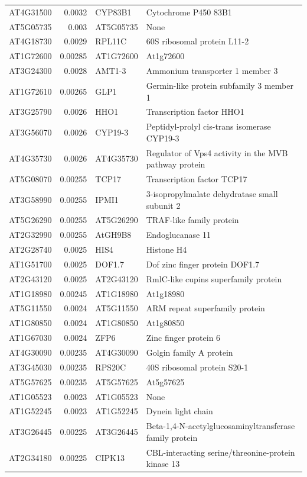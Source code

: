 \documentclass[11pt]{article}
\begin{document}
\begin{center}
\begin{tabular}{lrll}
AT4G31500 & 0.0032 & CYP83B1 & Cytochrome P450 83B1\\
AT5G05735 & 0.003 & AT5G05735 & None\\
AT4G18730 & 0.0029 & RPL11C & 60S ribosomal protein L11-2\\
AT1G72600 & 0.00285 & AT1G72600 & At1g72600\\
AT3G24300 & 0.0028 & AMT1-3 & Ammonium transporter 1 member 3\\
AT1G72610 & 0.00265 & GLP1 & Germin-like protein subfamily 3 member 1\\
AT3G25790 & 0.0026 & HHO1 & Transcription factor HHO1\\
AT3G56070 & 0.0026 & CYP19-3 & Peptidyl-prolyl cis-trans isomerase CYP19-3\\
AT4G35730 & 0.0026 & AT4G35730 & Regulator of Vps4 activity in the MVB pathway protein\\
AT5G08070 & 0.00255 & TCP17 & Transcription factor TCP17\\
AT3G58990 & 0.00255 & IPMI1 & 3-isopropylmalate dehydratase small subunit 2\\
AT5G26290 & 0.00255 & AT5G26290 & TRAF-like family protein\\
AT2G32990 & 0.00255 & AtGH9B8 & Endoglucanase 11\\
AT2G28740 & 0.0025 & HIS4 & Histone H4\\
AT1G51700 & 0.0025 & DOF1.7 & Dof zinc finger protein DOF1.7\\
AT2G43120 & 0.0025 & AT2G43120 & RmlC-like cupins superfamily protein\\
AT1G18980 & 0.00245 & AT1G18980 & At1g18980\\
AT5G11550 & 0.0024 & AT5G11550 & ARM repeat superfamily protein\\
AT1G80850 & 0.0024 & AT1G80850 & At1g80850\\
AT1G67030 & 0.0024 & ZFP6 & Zinc finger protein 6\\
AT4G30090 & 0.00235 & AT4G30090 & Golgin family A protein\\
AT3G45030 & 0.00235 & RPS20C & 40S ribosomal protein S20-1\\
AT5G57625 & 0.00235 & AT5G57625 & At5g57625\\
AT1G05523 & 0.0023 & AT1G05523 & None\\
AT1G52245 & 0.0023 & AT1G52245 & Dynein light chain\\
AT3G26445 & 0.00225 & AT3G26445 & Beta-1,4-N-acetylglucosaminyltransferase family protein\\
AT2G34180 & 0.00225 & CIPK13 & CBL-interacting serine/threonine-protein kinase 13\\

\end{tabular}
\end{center}
\end{document}
